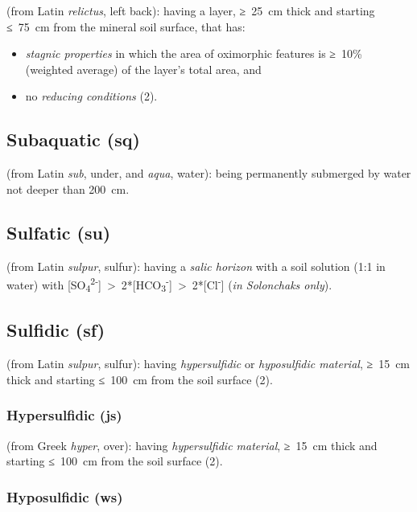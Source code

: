 \documentclass[
  letterpaper,
  DIV=11,
  numbers=noendperiod]{scrreprt}
\providecommand{\tightlist}{%
  \setlength{\itemsep}{0pt}\setlength{\parskip}{0pt}}\usepackage{longtable,booktabs,array}
\begin{document}
(from Latin \emph{relictus}, left back): having a layer, ≥~25~cm thick
and starting ≤~75~cm from the mineral soil surface, that has:

\begin{itemize}
\tightlist
\item
  \emph{stagnic properties} in which the area of oximorphic features is
  ≥~10\% (weighted average) of the layer's total area, and
\item
  no \emph{reducing conditions} (2).
\end{itemize}

\hypertarget{subaquatic-sq}{%
\subsection{Subaquatic (sq)}\label{subaquatic-sq}}

(from Latin \emph{sub}, under, and \emph{aqua}, water): being
permanently submerged by water not deeper than 200~cm.

\hypertarget{sulfatic-su}{%
\subsection{Sulfatic (su)}\label{sulfatic-su}}

(from Latin \emph{sulpur}, sulfur): having a \emph{salic horizon} with a
soil solution (1:1 in water) with
{[}SO\textsubscript{4}\textsuperscript{2-}{]}~\textgreater~2*{[}HCO\textsubscript{3}\textsuperscript{-}{]}~\textgreater~2*{[}Cl\textsuperscript{-}{]}
(\emph{in Solonchaks only}).

\hypertarget{sulfidic-sf}{%
\subsection{Sulfidic (sf)}\label{sulfidic-sf}}

(from Latin \emph{sulpur}, sulfur): having \emph{hypersulfidic} or
\emph{hyposulfidic material}, ≥~15~cm thick and starting ≤~100~cm from
the soil surface (2).

\hypertarget{hypersulfidic-js}{%
\subsubsection{Hypersulfidic (js)}\label{hypersulfidic-js}}

(from Greek \emph{hyper}, over): having \emph{hypersulfidic material},
≥~15~cm thick and starting ≤~100~cm from the soil surface (2).

\hypertarget{hyposulfidic-ws}{%
\subsubsection{Hyposulfidic (ws)}\label{hyposulfidic-ws}}
\end{document}
